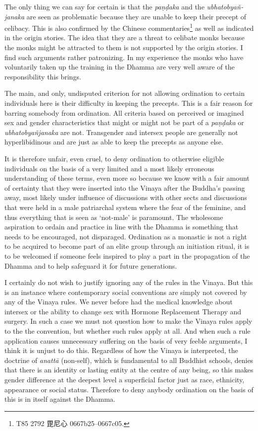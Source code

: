 The only thing we can say for certain is that the {\em paṇḍaka} and the {\em ubhatob­yañ­janaka} are seen as problematic because they are unable to keep their precept of celibacy. This is also confirmed by the Chinese commentaries\footnote{T85 2792 毘尼心 0667b25–0667c05.} as well as indicated in the origin stories. The idea that they are a threat to celibate monks because the monks might be attracted to them is not supported by the origin stories. I find such arguments rather patronizing. In my experience the monks who have voluntarily taken up the training in the Dhamma are very well aware of the responsibility this brings.

The main, and only, undisputed criterion for not allowing ordination to certain individuals here is their difficulty in keeping the precepts. This is a fair reason for barring somebody from ordination. All criteria based on perceived or imagined sex and gender characteristics that might or might not be part of a {\em paṇḍaka} or {\em ubhatob­yañ­janaka} are not. Transgender and intersex people are generally not hyperlibidinous and are just as able to keep the precepts as anyone else. 

It is therefore unfair, even cruel, to deny ordination to otherwise eligible individuals on the basis of a very limited and a most likely erroneous understanding of these terms, even more so because we know with a fair amount of certainty that they were inserted into the Vinaya after the Buddha's passing away, most likely under influence of discussions with other sects and discussions that were held in a male patriarchal system where the fear of the feminine, and thus everything that is seen as `not-male' is paramount. The wholesome aspiration to ordain and practice in line with the Dhamma is something that needs to be encouraged, not disparaged. Ordination as a monastic is not a right to be acquired to become part of an elite group through an initiation ritual, it is to be welcomed if someone feels inspired to play a part in the propagation of the Dhamma and to help safeguard it for future generations. 

I certainly do not wish to justify ignoring any of the rules in the Vinaya. But this is an instance where contemporary social conventions are simply not covered by any of the Vinaya rules. We never before had the medical knowledge about intersex or the ability to change sex with Hormone Replacement Therapy and surgery. In such a case we must not question how to make the Vinaya rules apply to the the convention, but whether such rules apply at all. And when such a rule application causes unnecessary suffering on the basis of very feeble arguments, I think it is unjust to do this. Regardless of how the Vinaya is interpreted, the doctrine of {\em anattā} (non-self), which is fundamental to all Buddhist schools, denies that there is an identity or lasting entity at the centre of any being, so this makes gender difference at the deepest level a superficial factor just as race, ethnicity, appearance or social status. Therefore to deny anybody ordination on the basis of this is in itself against the Dhamma.

